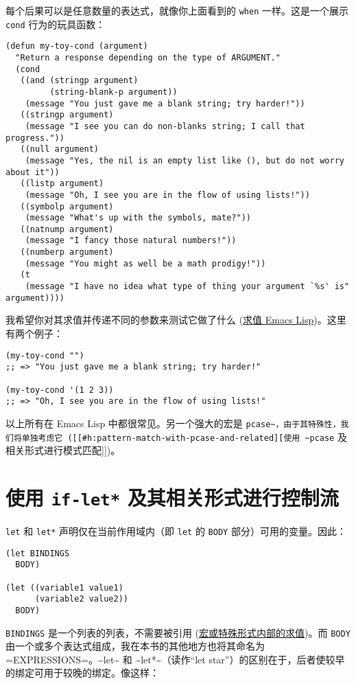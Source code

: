 \documentclass[11pt]{ctexart}
\begin{document}
每个后果可以是任意数量的表达式，就像你上面看到的 \texttt{when} 一样。这是一个展示 \texttt{cond} 行为的玩具函数：

\begin{verbatim}
(defun my-toy-cond (argument)
  "Return a response depending on the type of ARGUMENT."
  (cond
   ((and (stringp argument)
         (string-blank-p argument))
    (message "You just gave me a blank string; try harder!"))
   ((stringp argument)
    (message "I see you can do non-blanks string; I call that progress."))
   ((null argument)
    (message "Yes, the nil is an empty list like (), but do not worry about it"))
   ((listp argument)
    (message "Oh, I see you are in the flow of using lists!"))
   ((symbolp argument)
    (message "What's up with the symbols, mate?"))
   ((natnump argument)
    (message "I fancy those natural numbers!"))
   ((numberp argument)
    (message "You might as well be a math prodigy!"))
   (t
    (message "I have no idea what type of thing your argument `%s' is" argument))))
\end{verbatim}

我希望你对其求值并传递不同的参数来测试它做了什么 (\hyperref[sec:org5e72a31]{求值 Emacs Lisp})。这里有两个例子：

\begin{verbatim}
(my-toy-cond "")
;; => "You just gave me a blank string; try harder!"

(my-toy-cond '(1 2 3))
;; => "Oh, I see you are in the flow of using lists!"
\end{verbatim}

以上所有在 Emacs Lisp 中都很常见。另一个强大的宏是 \texttt{pcase\textasciitilde{}，由于其特殊性，我们将单独考虑它 ([[\#h:pattern-match-with-pcase-and-related][使用 \textasciitilde{}pcase} 及相关形式进行模式匹配]])。
\section{使用 \texttt{if-let*} 及其相关形式进行控制流}
\label{sec:org795b8c4}
\texttt{let} 和 \texttt{let*} 声明仅在当前作用域内（即 \texttt{let} 的 \texttt{BODY} 部分）可用的变量。因此：

\begin{verbatim}
(let BINDINGS
  BODY)

(let ((variable1 value1)
      (variable2 value2))
  BODY)
\end{verbatim}

\texttt{BINDINGS} 是一个列表的列表，不需要被引用 (\hyperref[sec:org6bfc8f0]{宏或特殊形式内部的求值})。而 \texttt{BODY} 由一个或多个表达式组成，我在本书的其他地方也将其命名为 =EXPRESSIONS=。\textasciitilde{}let\textasciitilde{} 和 \textasciitilde{}let*\textasciitilde{}（读作“let star”）的区别在于，后者使较早的绑定可用于较晚的绑定。像这样：
\end{document}
